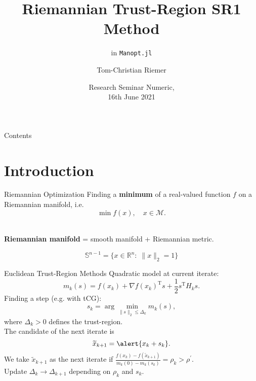 \documentclass{beamer}
\title{Riemannian Trust-Region SR1 Method}
\subtitle{in \lstinline!Manopt.jl!}
\author{Tom-Christian Riemer}
\institute{TU Chemnitz}
\date{Research Seminar Numeric,\\ 16th June 2021}
\begin{document}
\maketitle

\begin{frame}{Contents}
	\tableofcontents
\end{frame}

\section{Introduction}

\begin{frame}{Riemannian Optimization}
    Finding a \textbf{minimum} of a real-valued function $f$ on a Riemannian manifold, i.e.
    \begin{equation*}
        \min f(x), \quad x \in \mathcal{M}.
    \end{equation*}\\[1.\baselineskip]
    \begin{center}
        \textbf{Riemannian manifold} = smooth manifold + Riemannian metric. \\[1.\baselineskip]
    \end{center}
    \begin{equation*}
        \mathbb{S}^{n-1} = \{ x \in \mathbb{R}^n \colon \; \lVert x \rVert_2 = 1 \}
    \end{equation*}
\end{frame}

\begin{frame}{Euclidean Trust-Region Methods}
    \alert{Quadratic model} at current iterate:
	\begin{equation*}
    	m_k(s) = f(x_k) + {\nabla f(x_k)}^{\mathrm{T}} s + \frac{1}{2} s^{\mathrm{T}} H_k s.
    \end{equation*}
	Finding a \alert{step} (e.g. with tCG):
	\begin{equation*}
        s_k = \arg \min_{\lVert s \rVert_2 \leq \Delta_k} m_k(s),
    \end{equation*}
	where $\Delta_k > 0$ defines the \alert{trust-region}. \\
    The candidate of the next iterate is
	\begin{equation*}
        \widetilde{x}_{k+1} = \alert{x_k + s_k}.
    \end{equation*}
	We take $\widetilde{x}_{k+1}$ as the next iterate if $\frac{f(x_k) - f(\widetilde{x}_{k+1})}{m_k(0) - m_k(s_k)} =\rho_k > \rho^{\prime}$. \\
    Update $\Delta_k \rightarrow \Delta_{k+1}$ depending on $\rho_k$ and $s_k$.
\end{frame}
\end{document}
